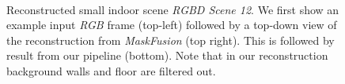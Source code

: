 \begin{figure}[t!]
    \centering
    \\
    \vspace{-2mm}
    \caption{Reconstructed small indoor scene \emph{RGBD Scene 12}. We first show an example input \textit{RGB} frame (top-left) followed by a top-down view of the reconstruction from \textit{MaskFusion} (top right). This is followed by result from our pipeline (bottom). Note that in our reconstruction background walls and floor are filtered out. }
    \vspace*{-1em}
    \label{fig:rgbd_scene12}
\end{figure}


